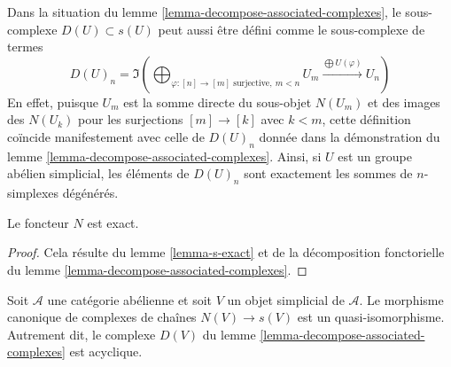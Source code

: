 \begin{remark}
\label{remark-degenerate-subcomplex}
Dans la situation du lemme \ref{lemma-decompose-associated-complexes}, le
sous-complexe $D(U) \subset s(U)$ peut aussi être défini comme le
sous-complexe de termes
$$
D(U)_n = \Im\left(
\bigoplus\nolimits_{\varphi : [n] \to [m]\text{ surjective}, \ m < n} U_m
\xrightarrow{\bigoplus U(\varphi)}
U_n\right)
$$
En effet, puisque $U_m$ est la somme directe du sous-objet $N(U_m)$ et
des images des $N(U_k)$ pour les surjections $[m] \to [k]$ avec $k < m$,
cette définition coïncide manifestement avec celle de $D(U)_n$ donnée
dans la démonstration du lemme \ref{lemma-decompose-associated-complexes}.
Ainsi, si $U$ est un groupe abélien simplicial, les éléments de $D(U)_n$
sont exactement les sommes de $n$-simplexes dégénérés.
\end{remark}

\begin{lemma}
\label{lemma-N-exact}
Le foncteur $N$ est exact.
\end{lemma}

\begin{proof}
Cela résulte du lemme \ref{lemma-s-exact} et de la décomposition
fonctorielle du lemme \ref{lemma-decompose-associated-complexes}.
\end{proof}

\begin{lemma}
\label{lemma-quasi-isomorphism}
Soit $\mathcal{A}$ une catégorie abélienne et soit $V$ un objet
simplicial de $\mathcal{A}$. Le morphisme canonique de complexes de
chaînes $N(V) \to s(V)$ est un quasi-isomorphisme. Autrement dit, le
complexe $D(V)$ du lemme \ref{lemma-decompose-associated-complexes} est
acyclique.
\end{lemma}

